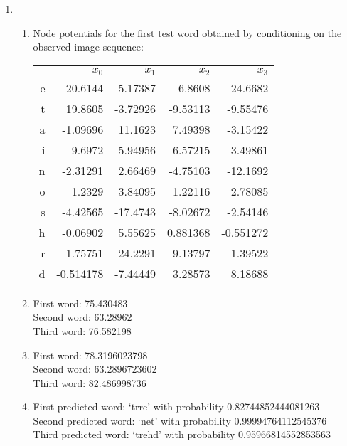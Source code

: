 \documentclass[12pt]{article}
\begin{document}
\begin{enumerate}

\item %
\begin{enumerate}
\item %
Node potentials for the first test word obtained by conditioning on the observed image sequence:
\begin{center}
\begin{tabular}{rrrrr}
 & $x_0$ & $x_1$ & $x_2$ & $x_3$ \\
e  & -20.6144 & -5.17387 & 6.8608 & 24.6682 \\
t  & 19.8605 & -3.72926 & -9.53113 & -9.55476 \\
a  & -1.09696 & 11.1623 & 7.49398 & -3.15422 \\
i  & 9.6972 & -5.94956 & -6.57215 & -3.49861 \\
n  & -2.31291 & 2.66469 & -4.75103 & -12.1692 \\
o  & 1.2329 & -3.84095 & 1.22116 & -2.78085 \\
s  & -4.42565 & -17.4743 & -8.02672 & -2.54146 \\
h  & -0.06902 & 5.55625 & 0.881368 & -0.551272 \\
r  & -1.75751 & 24.2291 & 9.13797 & 1.39522 \\
d  & -0.514178 & -7.44449 & 3.28573 & 8.18688 \\
\end{tabular}
\end{center}

\item %
First word: 75.430483\\
Second word: 63.28962\\
Third word: 76.582198

\item %
First word: 78.3196023798\\
Second word: 63.2896723602\\
Third word: 82.486998736

\item %
First predicted word: `trre' with probability 0.82744852444081263\\
Second predicted word: `net' with probability 0.99994764112545376\\
Third predicted word: `trehd' with probability 0.95966814552853563


\end{enumerate}
\end{enumerate}
\end{document}
